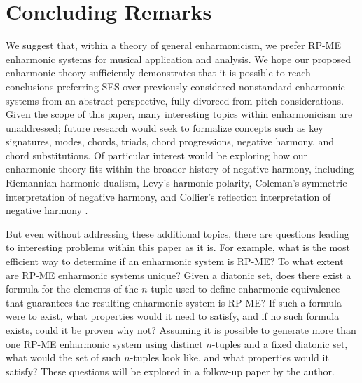 \documentclass{article}
\theoremstyle{plain}
\theoremstyle{definition}
\theoremstyle{remark}
\begin{document}
\section{Concluding Remarks}
\label{SEC.Concluding Remarks}

We suggest that, within a theory of general enharmonicism, we prefer RP-ME enharmonic systems for musical application and analysis. We hope our proposed enharmonic theory sufficiently demonstrates that it is possible to reach conclusions preferring SES over previously considered nonstandard enharmonic systems from an abstract perspective, fully divorced from pitch considerations. Given the scope of this paper, many interesting topics within enharmonicism are unaddressed; future research would seek to formalize concepts such as key signatures, modes, chords, triads, chord progressions, negative harmony, and chord substitutions. Of particular interest would be exploring how our enharmonic theory fits within the broader history of negative harmony, including Riemannian harmonic dualism, Levy's harmonic polarity, Coleman's symmetric interpretation of negative harmony, and Collier's reflection interpretation of negative harmony \cite{Haller}.

But even without addressing these additional topics, there are questions leading to interesting problems within this paper as it is. For example, what is the most efficient way to determine if an enharmonic system is RP-ME? To what extent are RP-ME enharmonic systems unique? Given a diatonic set, does there exist a formula for the elements of the $n$-tuple used to define enharmonic equivalence that guarantees the resulting enharmonic system is RP-ME? If such a formula were to exist, what properties would it need to satisfy, and if no such formula exists, could it be proven why not? Assuming it is possible to generate more than one RP-ME enharmonic system using distinct $n$-tuples and a fixed diatonic set, what would the set of such $n$-tuples look like, and what properties would it satisfy? These questions will be explored in a follow-up paper by the author.



\end{document}
